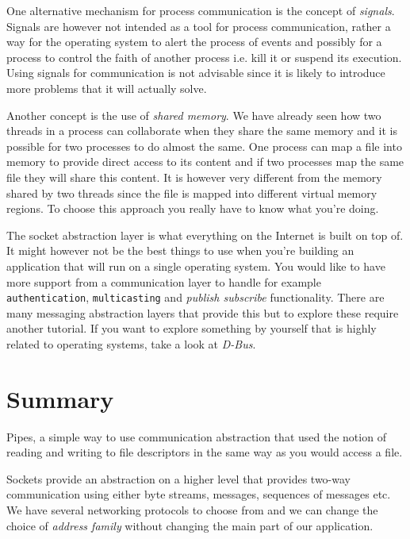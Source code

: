 \documentclass[a4paper,11pt]{article}
\begin{document}
One alternative mechanism for process communication is the concept of
{\em signals}. Signals are however not intended as a tool for process
communication, rather a way for the operating system to alert the
process of events and possibly for a process to control the faith of
another process i.e. kill it or suspend its execution. Using signals
for communication is not advisable since it is likely to introduce
more problems that it will actually solve.

Another concept is the use of {\em shared memory}. We have already
seen how two threads in a process can collaborate when they share the
same memory and it is possible for two processes to do almost the
same. One process can map a file into memory to provide direct access
to its content and if two processes map the same file they will share
this content. It is however very different from the memory shared by
two threads since the file is mapped into different virtual memory
regions. To choose this approach you really have to know what you're
doing.

The socket abstraction layer is what everything on the Internet is
built on top of. It might however not be the best things to use when
you're building an application that will run on a single operating
system. You would like to have more support from a communication layer
to handle for example {\tt authentication}, {\tt multicasting} and
{\em publish subscribe} functionality. There are many messaging
abstraction layers that provide this but to explore these require
another tutorial. If you want to explore something by yourself that is
highly related to operating systems, take a look at {\em D-Bus}.

\section{Summary}

Pipes, a simple way to use communication abstraction that used the notion
of reading and writing to file descriptors in the same way as you
would access a file.

Sockets provide an abstraction on a higher level that provides two-way
communication using either byte streams, messages, sequences of
messages etc. We have several networking protocols to choose from and
we can change the choice of {\em address family} without changing the
main part of our application.
\end{document}
